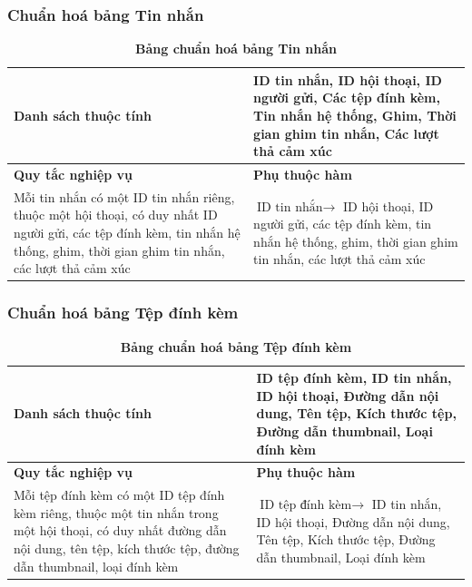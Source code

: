 \subsubsection{Chuẩn hoá bảng Tin nhắn}
\mbox{}

\begin{table}[H]
  \caption{\bfseries \fontsize{12pt}{0pt}\selectfont Bảng chuẩn hoá bảng Tin nhắn}
  \centering
  \begin{tabularx}{0.9\textwidth}{|X|X|}
    \hline
    \textbf{Danh sách thuộc tính} & ID tin nhắn, ID hội thoại, ID người gửi, Các tệp đính kèm, 
    Tin nhắn hệ thống, Ghim, Thời gian ghim tin nhắn, Các lượt thả cảm xúc \\
    \hline
    \textbf{Quy tắc nghiệp vụ} & \textbf{Phụ thuộc hàm} \\
    \hline
    Mỗi tin nhắn có một ID tin nhắn riêng, thuộc một hội thoại, có duy nhất ID người gửi, các tệp đính kèm,
    tin nhắn hệ thống, ghim, thời gian ghim tin nhắn, các lượt thả cảm xúc
    & \parbox[t]{\linewidth}{$\text{ID tin nhắn} \rightarrow$ ID hội thoại, ID người gửi, các tệp đính kèm,
    tin nhắn hệ thống, ghim, thời gian ghim tin nhắn, các lượt thả cảm xúc} \\
    \hline
     \\
     \\
    \hline
  \end{tabularx}
\end{table}

\subsubsection{Chuẩn hoá bảng Tệp đính kèm}
\mbox{}

\begin{table}[H]
  \caption{\bfseries \fontsize{12pt}{0pt}\selectfont Bảng chuẩn hoá bảng Tệp đính kèm}
  \centering
  \begin{tabularx}{0.9\textwidth}{|X|X|}
    \hline
    \textbf{Danh sách thuộc tính} & ID tệp đính kèm, ID tin nhắn, ID hội thoại, Đường dẫn nội
    dung, Tên tệp, Kích thước tệp, Đường dẫn thumbnail, Loại đính kèm \\
    \hline
    \textbf{Quy tắc nghiệp vụ} & \textbf{Phụ thuộc hàm} \\
    \hline
    Mỗi tệp đính kèm có một ID tệp đính kèm riêng, thuộc một tin nhắn trong một hội thoại, có duy nhất đường dẫn nội
    dung, tên tệp, kích thước tệp, đường dẫn thumbnail, loại đính kèm
    & \parbox[t]{\linewidth}{$\text{ID tệp đính kèm} \rightarrow$ ID tin nhắn, ID hội thoại, Đường dẫn nội
    dung, Tên tệp, Kích thước tệp, Đường dẫn thumbnail, Loại đính kèm} \\
    \hline
     \\
     \\
    \hline
  \end{tabularx}
\end{table}

